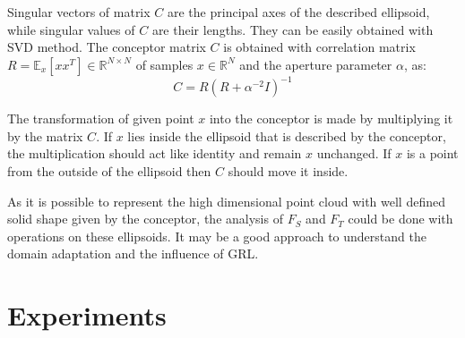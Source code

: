 \documentclass{article}
\begin{document}
Singular vectors of matrix $C$ are the principal axes of the described ellipsoid, while singular values of $C$ are their lengths. They can be easily obtained with SVD method. The conceptor matrix $C$ is obtained with correlation matrix $R = \mathbb{E}_{x}[xx^{T}] \in \mathbb{R}^{N\times N}$ of samples $x \in \mathbb{R}^{N}$ and the aperture parameter $\alpha$, as:
\begin{equation*}
    C = R(R + \alpha^{-2} I)^{-1}
\end{equation*}
\par
The transformation of given point $x$ into the conceptor is made by multiplying it by the matrix $C$. If $x$ lies inside the ellipsoid that is described by the conceptor, the multiplication should act like identity and remain $x$ unchanged. If $x$ is a point from the outside of the ellipsoid then $C$ should move it inside.
\par
As it is possible to represent the high dimensional point cloud with well defined solid shape given by the conceptor, the analysis of $F_{S}$ and $F_{T}$ could be done with operations on these ellipsoids. It may be a good approach to understand the domain adaptation and the influence of GRL.

\section{Experiments}
\end{document}

